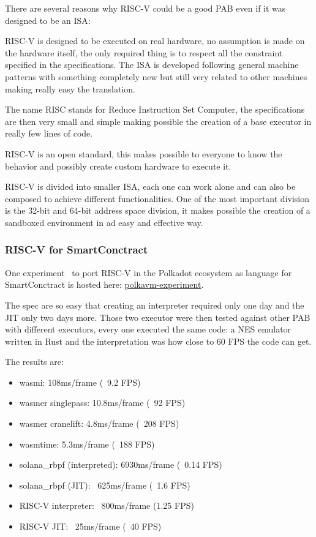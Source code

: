 \documentclass[../main.tex]{subfiles}
\begin{document}
There are several reasons why RISC-V could be a good PAB even if it was designed to be an ISA:
\begin{description}[style=nextline]
  \item[Real ISA suitable for direct native hardware implementation]
        RISC-V is designed to be executed on real hardware, no assumption is made on the hardware itself, the only required thing is to respect all the constraint specified in the specifications. The ISA is developed following general machine patterns with something completely new but still very related to other machines making really easy the translation.
  \item[RISC]
        The name RISC stands for Reduce Instruction Set Computer, the specifications are then very small and simple making possible the creation of a base executor in really few lines of code.
  \item[Completely open ISA]
        RISC-V is an open standard, this makes possible to everyone to know the behavior and possibly create custom hardware to execute it.
  \item[ISA separated into a small base integer ISA]
        RISC-V is divided into smaller ISA, each one can work alone and can also be composed to achieve different functionalities. One of the most important division is the 32-bit and 64-bit address space division, it makes possible the creation of a sandboxed environment in ad easy and effective way.
\end{description}

\subsubsection{RISC-V for SmartConctract}

One experiment~\cite{polkavm-forum} to port RISC-V in the Polkadot ecosystem as language for SmartConctract is hosted here: \href{https://github.com/koute/polkavm-experiment}{polkavm-experiment}.

The spec are so easy that creating an interpreter required only one day and the JIT only two days more. Those two executor were then tested against other PAB with different executors, every one executed the same code: a NES emulator written in Rust and the interpretation was how close to 60 FPS the code can get.

The results are:
\begin{itemize}
    \item wasmi: 108ms/frame (~9.2 FPS)
    \item wasmer singlepass: 10.8ms/frame (~92 FPS)
    \item wasmer cranelift: 4.8ms/frame (~208 FPS)
    \item wasmtime: 5.3ms/frame (~188 FPS)
    \item solana\_rbpf (interpreted): 6930ms/frame (~0.14 FPS)
    \item solana\_rbpf (JIT): ~625ms/frame (~1.6 FPS)
    \item RISC-V interpreter: ~800ms/frame (1.25 FPS)
    \item RISC-V JIT: ~25ms/frame (~40 FPS)
\end{itemize}
\end{document}
